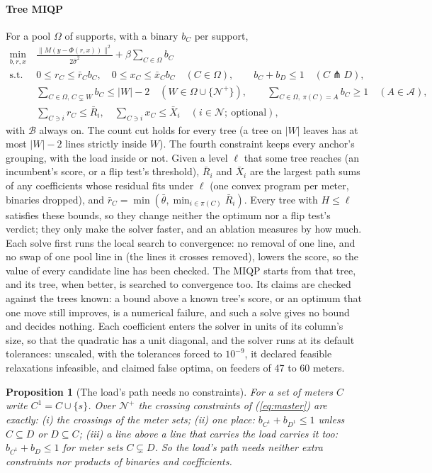 \documentclass[journal,onecolumn,11pt]{IEEEtran}
\newtheorem{proposition}{Proposition}
\newcommand{\Nset}{\mathcal{N}}
\newcommand{\Bset}{\mathcal{B}}
\newcommand{\Aset}{\mathcal{A}}
\newcommand{\cross}{\pitchfork}
\begin{document}
\paragraph*{Tree MIQP} For a pool $\Omega$ of supports, with a binary $b_C$ per support,
\begin{equation}\label{eq:master}
\begin{aligned}
\min_{b,r,x}\ &\frac{\|M(y-\Phi(r,x))\|^2}{2\hat\sigma^2}+\beta\sum_{C\in\Omega}b_C\\
\text{s.t.}\ \ &0\le r_C\le\bar r_Cb_C,\quad0\le x_C\le\bar x_Cb_C\quad(C\in\Omega),\qquad b_C+b_D\le1\quad(C\cross D),\\
&\textstyle\sum_{C\in\Omega,\,C\subsetneq W}b_C\le|W|-2\quad(W\in\Omega\cup\{\Nset^+\}),\qquad
\sum_{C\in\Omega,\ \pi(C)=A}b_C\ge1\quad(A\in\Aset),\\
&\textstyle\sum_{C\ni i}r_C\le\bar R_i,\quad\sum_{C\ni i}x_C\le\bar X_i\quad(i\in\Nset;\ \text{optional}),
\end{aligned}
\end{equation}
with $\Bset$ always on. The count cut holds for every tree (a tree on $|W|$ leaves has at most $|W|-2$ lines strictly inside
$W$). The fourth constraint keeps every anchor's grouping, with the load inside or not. Given a level $\ell$ that some tree
reaches (an incumbent's score, or a flip test's threshold), $\bar R_i$ and $\bar X_i$ are the largest path sums of any
coefficients whose residual fits under $\ell$ (one convex program per meter, binaries dropped), and
$\bar r_C=\min(\bar\theta,\min_{i\in\pi(C)}\bar R_i)$. Every tree with $H\le\ell$ satisfies these bounds, so they change
neither the optimum nor a flip test's verdict; they only make the solver faster, and an ablation measures by how much. Each
solve first runs the local search to convergence: no removal of one line, and no swap of one pool line in (the lines it
crosses removed), lowers the score, so the value of every candidate line has been checked. The MIQP starts from that tree,
and its tree, when better, is searched to convergence too. Its claims are checked against the trees known: a bound above
a known tree's score, or an optimum that one move still improves, is a numerical failure, and such a solve gives no bound
and decides nothing. Each coefficient enters the solver in units of its column's size, so that the quadratic has a unit
diagonal, and the solver runs at its default tolerances: unscaled, with the tolerances forced to $10^{-9}$, it declared
feasible relaxations infeasible, and claimed false optima, on feeders of 47 to 60 meters.
\begin{proposition}[The load's path needs no constraints]\label{prop:path}
For a set of meters $C$ write $C^1=C\cup\{s\}$. Over $\Nset^+$ the crossing constraints of (\ref{eq:master}) are exactly:
(i) the crossings of the meter sets; (ii) one place: $b_{C^1}+b_{D^1}\le1$ unless $C\subseteq D$ or $D\subseteq C$; (iii) a
line above a line that carries the load carries it too: $b_{C^1}+b_D\le1$ for meter sets $C\subsetneq D$. So the load's path
needs neither extra constraints nor products of binaries and coefficients.
\end{proposition}
\end{document}
